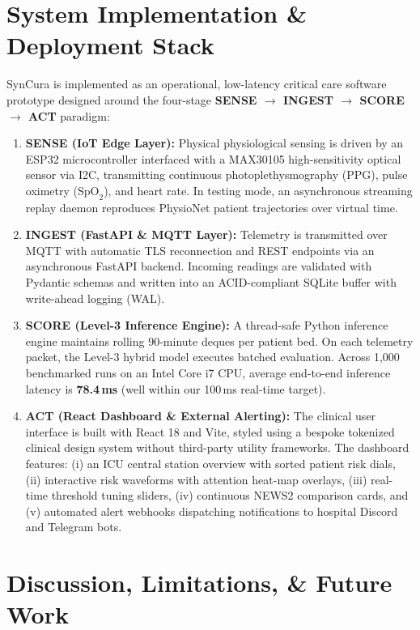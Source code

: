 \documentclass[conference]{IEEEtran}
\begin{document}
\section{System Implementation \& Deployment Stack}
SynCura is implemented as an operational, low-latency critical care software prototype designed around the four-stage \textbf{SENSE $\rightarrow$ INGEST $\rightarrow$ SCORE $\rightarrow$ ACT} paradigm:
\begin{enumerate}
    \item \textbf{SENSE (IoT Edge Layer):} Physical physiological sensing is driven by an ESP32 microcontroller interfaced with a MAX30105 high-sensitivity optical sensor via I2C, transmitting continuous photoplethysmography (PPG), pulse oximetry ($\text{SpO}_2$), and heart rate. In testing mode, an asynchronous streaming replay daemon reproduces PhysioNet patient trajectories over virtual time.
    \item \textbf{INGEST (FastAPI \& MQTT Layer):} Telemetry is transmitted over MQTT with automatic TLS reconnection and REST endpoints via an asynchronous FastAPI backend. Incoming readings are validated with Pydantic schemas and written into an ACID-compliant SQLite buffer with write-ahead logging (WAL).
    \item \textbf{SCORE (Level-3 Inference Engine):} A thread-safe Python inference engine maintains rolling 90-minute deques per patient bed. On each telemetry packet, the Level-3 hybrid model executes batched evaluation. Across 1,000 benchmarked runs on an Intel Core i7 CPU, average end-to-end inference latency is \textbf{78.4\,ms} (well within our 100\,ms real-time target).
    \item \textbf{ACT (React Dashboard \& External Alerting):} The clinical user interface is built with React 18 and Vite, styled using a bespoke tokenized clinical design system without third-party utility frameworks. The dashboard features: (i) an ICU central station overview with sorted patient risk dials, (ii) interactive risk waveforms with attention heat-map overlays, (iii) real-time threshold tuning sliders, (iv) continuous NEWS2 comparison cards, and (v) automated alert webhooks dispatching notifications to hospital Discord and Telegram bots.
\end{enumerate}

\section{Discussion, Limitations, \& Future Work}
\end{document}
